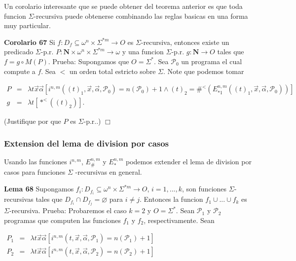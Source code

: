 Un corolario interesante que se puede obtener del teorema anterior es que toda funcion \(\Sigma \)-recursiva puede obtenerse combinando las reglas basicas en una forma muy particular.




\textbf{Corolario 67} Si \(f:D_{f}\subseteq \omega ^{n}\times \Sigma ^{\ast m}\rightarrow O\) es \( \Sigma \)-recursiva, entonces existe un predicado \(\Sigma \)-p.r. \(P:\mathbf{N} \times \omega ^{n}\times \Sigma ^{\ast m}\rightarrow \omega \) y una funcion \( \Sigma \)-p.r. \(g:\mathbf{N}\rightarrow O\) tales que \(f=g\circ M(P).\)
Prueba: Supongamos que \(O=\Sigma ^{\ast }\). Sea \(\mathcal{P}_{0}\) un programa el cual compute a \(f\). Sea \(< \) un orden total estricto sobre \(\Sigma \). Note que podemos tomar

\(\displaystyle \begin{array}{rcl} P & =& \lambda t\vec{x}\vec{\alpha}[i^{n,m}\left( (t)_{1},\vec{x},\vec{\alpha}, \mathcal{P}_{0}\right) =n(\mathcal{P}_{0})+1\wedge (t)_{2}=\#^{< }(E_{\ast 1}^{n,m}((t)_{1},\vec{x},\vec{\alpha},\mathcal{P}_{0}))] \\ g & =& \lambda t\left[ \ast ^{< }((t)_{2})\right] \text{.} \end{array} \)

(Justifique por que \(P\) es \(\Sigma \)-p.r..) \(\Box\)
\subsubsection{Extension del lema de division por casos}

Usando las funciones \(i^{n,m}\), \(E_{\#}^{n,m}\) y \(E_{\ast }^{n,m}\) podemos extender el lema de division por casos para funciones \(\Sigma \) -recursivas en general.




\textbf{Lema 68} Supongamos \(f_{i}:D_{f_{i}}\subseteq \omega ^{n}\times \Sigma ^{\ast m}\rightarrow O\), \(i=1,...,k\), son funciones \(\Sigma \)-recursivas tales que \(D_{f_{i}}\cap D_{f_{j}}=\varnothing \) para \(i\neq j\). Entonces la funcion \(f_{1}\cup ...\cup f_{k}\) es \(\Sigma \)-recursiva.
Prueba: Probaremos el caso \(k=2\) y \(O=\Sigma ^{\ast }\). Sean \(\mathcal{P}_{1}\) y \( \mathcal{P}_{2}\) programas que computen las funciones \(f_{1}\) y \(f_{2}\), respectivamente. Sean

\(\displaystyle \begin{array}{rcl} P_{1} & =& \lambda t\vec{x}\vec{\alpha}\left[ i^{n,m}(t,\vec{x},\vec{\alpha}, \mathcal{P}_{1})=n(\mathcal{P}_{1})+1\right] \\ P_{2} & =& \lambda t\vec{x}\vec{\alpha}\left[ i^{n,m}(t,\vec{x},\vec{\alpha}, \mathcal{P}_{2})=n(\mathcal{P}_{2})+1\right] \end{array} \)

